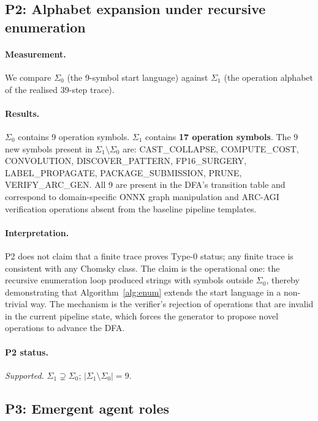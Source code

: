 \subsection{P2: Alphabet expansion under recursive enumeration}

\paragraph{Measurement.}
We compare $\Sigma_0$ (the 9-symbol start language) against $\Sigma_1$
(the operation alphabet of the realised 39-step trace).

\paragraph{Results.}
$\Sigma_0$ contains 9 operation symbols.
$\Sigma_1$ contains \textbf{17 operation symbols}.
The 9 new symbols present in $\Sigma_1 \setminus \Sigma_0$ are:
\textsf{CAST\_COLLAPSE}, \textsf{COMPUTE\_COST},
\textsf{CONVOLUTION}, \textsf{DISCOVER\_PATTERN},
\textsf{FP16\_SURGERY}, \textsf{LABEL\_PROPAGATE},
\textsf{PACKAGE\_SUBMISSION}, \textsf{PRUNE},
\textsf{VERIFY\_ARC\_GEN}.
All 9 are present in the DFA's transition table and correspond
to domain-specific ONNX graph manipulation and ARC-AGI verification
operations absent from the baseline pipeline templates.

\paragraph{Interpretation.}
P2 does not claim that a finite trace proves Type-0 status;
any finite trace is consistent with any Chomsky class.
The claim is the operational one: the recursive enumeration loop
produced strings with symbols outside $\Sigma_0$, thereby
demonstrating that Algorithm~\ref{alg:enum} extends the start
language in a non-trivial way.  The mechanism is the verifier's
rejection of operations that are invalid in the current pipeline
state, which forces the generator to propose novel operations
to advance the DFA.

\paragraph{P2 status.}  \emph{Supported.}
$\Sigma_1 \supsetneq \Sigma_0$;
$|\Sigma_1 \setminus \Sigma_0| = 9$.

\subsection{P3: Emergent agent roles}

